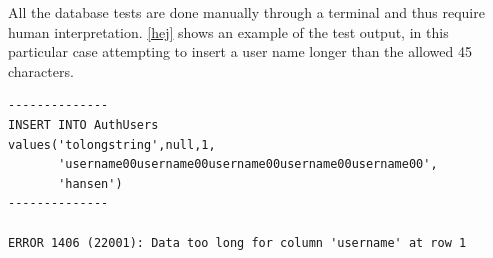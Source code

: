 All the database tests are done manually through a terminal and thus require human interpretation. \autoref{hej} shows an example of the test output, in this particular case attempting
to insert a user name longer than the allowed 45 characters. 


\begin{Code}
\begin{lstlisting}[label=hej,caption=Test case output]
--------------
INSERT INTO AuthUsers
values('tolongstring',null,1,
       'username00username00username00username00username00',
       'hansen')
--------------

ERROR 1406 (22001): Data too long for column 'username' at row 1
\end{lstlisting}
\end{Code}







